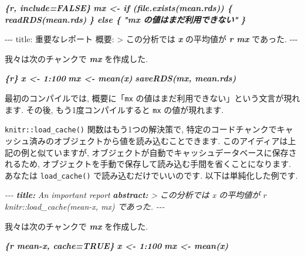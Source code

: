 \documentclass[
  11pt,
  lualatex,ja=standard,jafont=noto]{bxjsreport}
\newenvironment{Shaded}{\begin{snugshade}}{\end{snugshade}}
\newcommand{\AnnotationTok}[1]{\textcolor[rgb]{0.56,0.35,0.01}{\textbf{\textit{#1}}}}
\newcommand{\CommentTok}[1]{\textcolor[rgb]{0.56,0.35,0.01}{\textit{#1}}}
\newcommand{\InformationTok}[1]{\textcolor[rgb]{0.56,0.35,0.01}{\textbf{\textit{#1}}}}
\newcommand{\NormalTok}[1]{#1}
\begin{document}
\begin{Shaded}
\begin{Highlighting}[]
\InformationTok{\textasciigrave{}\textasciigrave{}\textasciigrave{}\{r, include=FALSE\}}
\InformationTok{mx \textless{}{-} if (file.exists(\textquotesingle{}mean.rds\textquotesingle{})) \{}
\InformationTok{  readRDS(\textquotesingle{}mean.rds\textquotesingle{})}
\InformationTok{\} else \{}
\InformationTok{  "\textasciigrave{}mx\textasciigrave{} の値はまだ利用できない"}
\InformationTok{\}}
\InformationTok{\textasciigrave{}\textasciigrave{}\textasciigrave{}}

\NormalTok{{-}{-}{-}}
\NormalTok{title: 重要なレポート}
\NormalTok{概要: \textgreater{}}
\NormalTok{  この分析では }\InformationTok{\textasciigrave{}x\textasciigrave{}}\NormalTok{ の平均値が}
  \InformationTok{\textasciigrave{}r mx\textasciigrave{}}\NormalTok{ であった.}
\NormalTok{{-}{-}{-}}

\NormalTok{我々は次のチャンクで }\InformationTok{\textasciigrave{}mx\textasciigrave{}}\NormalTok{ を作成した.}

\InformationTok{\textasciigrave{}\textasciigrave{}\textasciigrave{}\{r\}}
\InformationTok{x \textless{}{-} 1:100}
\InformationTok{mx \textless{}{-} mean(x)}
\InformationTok{saveRDS(mx, \textquotesingle{}mean.rds\textquotesingle{})}
\InformationTok{\textasciigrave{}\textasciigrave{}\textasciigrave{}}
\end{Highlighting}
\end{Shaded}

最初のコンパイルでは, 概要に「\texttt{mx} の値はまだ利用できない」という文言が現れます. その後, もう1度コンパイルすると \texttt{mx} の値が現れます.

\texttt{knitr::load\_cache()} 関数はもう1つの解決策で, 特定のコードチャンクでキャッシュ済みのオブジェクトから値を読み込むことできます. このアイディアは上記の例と似ていますが, オブジェクトが自動でキャッシュデータベースに保存されるため, オブジェクトを手動で保存して読み込む手間を省くことになります. あなたは \texttt{load\_cache()} で読み込むだけでいいのです. 以下は単純化した例です.

\begin{Shaded}
\begin{Highlighting}[]
\CommentTok{{-}{-}{-}}
\AnnotationTok{title:}\CommentTok{ An important report}
\AnnotationTok{abstract:}\CommentTok{ \textgreater{}}
\CommentTok{  この分析では \textasciigrave{}x\textasciigrave{} の平均値が}
\CommentTok{  \textasciigrave{}r knitr::load\_cache(\textquotesingle{}mean{-}x\textquotesingle{}, \textquotesingle{}mx\textquotesingle{})\textasciigrave{} であった.}
\CommentTok{{-}{-}{-}}

\NormalTok{我々は次のチャンクで }\InformationTok{\textasciigrave{}mx\textasciigrave{}}\NormalTok{ を作成した.}

\InformationTok{\textasciigrave{}\textasciigrave{}\textasciigrave{}\{r mean{-}x, cache=TRUE\}}
\InformationTok{x \textless{}{-} 1:100}
\InformationTok{mx \textless{}{-} mean(x)}
\InformationTok{\textasciigrave{}\textasciigrave{}\textasciigrave{}}
\end{Highlighting}
\end{Shaded}
\end{document}
